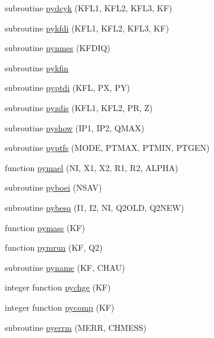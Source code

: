 \begin{DoxyCompactItemize}
\item 
subroutine \hyperlink{pythia-6_84_824_8f_a9c5eaf03cea7f0d97f5783fd071c1409}{pydcyk} (K\+F\+L1, K\+F\+L2, K\+F\+L3, KF)
\item 
subroutine \hyperlink{pythia-6_84_824_8f_ab762550f3025c60b2731636ec9577946}{pykfdi} (K\+F\+L1, K\+F\+L2, K\+F\+L3, KF)
\item 
subroutine \hyperlink{pythia-6_84_824_8f_a489aaca35db439fe8d6a80cddc152851}{pynmes} (K\+F\+D\+IQ)
\item 
subroutine \hyperlink{pythia-6_84_824_8f_a2839a1d21bd6048577c81f57f24a7e41}{pykfin}
\item 
subroutine \hyperlink{pythia-6_84_824_8f_a8f241358dd296a387019d41fb2f9ec46}{pyptdi} (K\+FL, PX, PY)
\item 
subroutine \hyperlink{pythia-6_84_824_8f_afb341942695f61070b394bd15ac8dc30}{pyzdis} (K\+F\+L1, K\+F\+L2, PR, Z)
\item 
subroutine \hyperlink{pythia-6_84_824_8f_a71b2257a4e5d19b7b94b70fee55bea56}{pyshow} (I\+P1, I\+P2, Q\+M\+AX)
\item 
subroutine \hyperlink{pythia-6_84_824_8f_a7fce06ff25ae6503bb24f0f3c9b453b3}{pyptfs} (M\+O\+DE, P\+T\+M\+AX, P\+T\+M\+IN, P\+T\+G\+EN)
\item 
function \hyperlink{pythia-6_84_824_8f_a77daa748922eb89e9148b8a9f2eebaff}{pymael} (NI, X1, X2, R1, R2, A\+L\+P\+HA)
\item 
subroutine \hyperlink{pythia-6_84_824_8f_a75d3d9086fc46ac587fe0bdf03c46f63}{pyboei} (N\+S\+AV)
\item 
subroutine \hyperlink{pythia-6_84_824_8f_a5bcab5f268d645f005de48b6ca8f2761}{pybesq} (I1, I2, NI, Q2\+O\+LD, Q2\+N\+EW)
\item 
function \hyperlink{pythia-6_84_824_8f_ad69903a1054f4f77d45fd8fe4c687aa9}{pymass} (KF)
\item 
function \hyperlink{pythia-6_84_824_8f_a342cc0b3b1534ea728c6cc519dfc55dc}{pymrun} (KF, Q2)
\item 
subroutine \hyperlink{pythia-6_84_824_8f_ab0dbe916b7d36854c02faf180f41d585}{pyname} (KF, C\+H\+AU)
\item 
integer function \hyperlink{pythia-6_84_824_8f_a27f75936fde97780175fa2c990bc61cd}{pychge} (KF)
\item 
integer function \hyperlink{pythia-6_84_824_8f_a283d6b08c44ddda84be0225d134caa87}{pycomp} (KF)
\item 
subroutine \hyperlink{pythia-6_84_824_8f_a8a7efe2037220dc632000fb06895ebca}{pyerrm} (M\+E\+RR, C\+H\+M\+E\+SS)
\item 

\end{DoxyCompactItemize}
